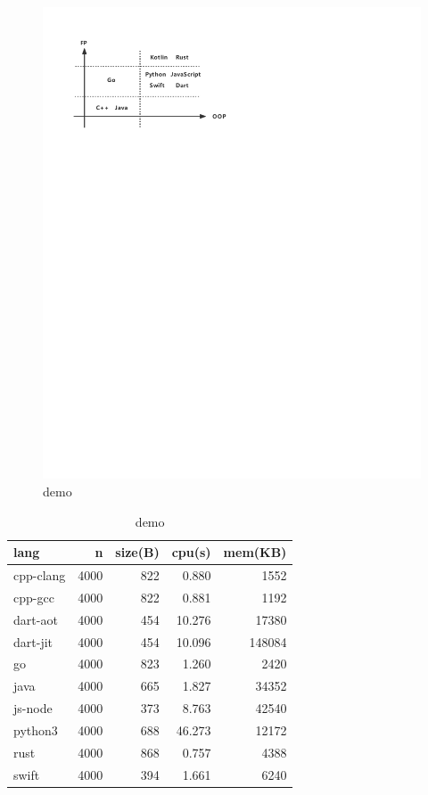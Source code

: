 \begin{figure}[htbp]
    \centerline{\includegraphics[scale=0.8]{figures/paradigm}}
    \caption{demo}
    \label{fig:sample_figure}
\end{figure}

\begin{table}[htbp]
    \caption{demo}
    \label{tab:demo}
    \begin{center}
        \begin{tabular}{lrrrr}
            \toprule
            lang      & n    & size(B) & cpu(s) & mem(KB) \\
            \midrule
            cpp-clang & 4000 & 822     & 0.880  & 1552    \\
            cpp-gcc   & 4000 & 822     & 0.881  & 1192    \\
            dart-aot  & 4000 & 454     & 10.276 & 17380   \\
            dart-jit  & 4000 & 454     & 10.096 & 148084  \\
            go        & 4000 & 823     & 1.260  & 2420    \\
            java      & 4000 & 665     & 1.827  & 34352   \\
            js-node   & 4000 & 373     & 8.763  & 42540   \\
            python3   & 4000 & 688     & 46.273 & 12172   \\
            rust      & 4000 & 868     & 0.757  & 4388    \\
            swift     & 4000 & 394     & 1.661  & 6240    \\
            \bottomrule
        \end{tabular}
    \end{center}
\end{table}

